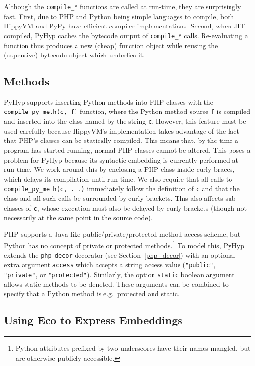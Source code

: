 \documentclass[a4paper,UKenglish]{lipics-v2016}
\newcommand{\ourvm}{PyHyp\xspace}
\newcommand{\hippy}{HippyVM\xspace}
\newcommand{\pypy}{PyPy\xspace}
\begin{document}
Although the \texttt{compile\_*} functions are called at run-time, they are
surprisingly fast. First, due to PHP and Python being simple languages to
compile, both \hippy and \pypy have efficient compiler implementations.
Second, when JIT compiled, \ourvm caches the bytecode output of \texttt{compile\_*}
calls. Re-evaluating a function thus produces a new (cheap) function object
while reusing the (expensive) bytecode object which underlies it.


\subsection{Methods}
\label{sec:methodemb}

\ourvm supports inserting Python methods into PHP classes with the
\texttt{compile\_py\_meth(c, f)} function, where the Python method source \texttt{f} is
compiled and inserted into the class named by the string \texttt{c}. However,
this feature must be used carefully because \hippy's implementation takes advantage of
the fact that PHP's classes can be statically compiled. This means that,
by the time a program has started running, normal PHP classes cannot
be altered. This poses a problem for \ourvm because its syntactic
embedding is currently performed at run-time. We work around this by enclosing a
PHP class inside curly braces, which delays its
compilation until run-time. We also require that all
calls to \texttt{compile\_py\_meth(c, ...)} immediately follow the
definition of \texttt{c} and that the class and all such calls be surrounded by
curly brackets. This also affects sub-classes of \texttt{c}, whose execution
must also be delayed by curly brackets (though not necessarily at the same
point in the source code).

PHP supports a Java-like public/private/protected method access scheme, but
Python has no concept of private or protected
methods.\footnote{Python attributes prefixed by two underscores have their
names mangled, but are otherwise publicly accessible.} To model this,
\ourvm extends the \texttt{php\_decor} decorator (see
Section~\ref{php_decor}) with an optional extra
argument \texttt{access} which accepts a string access value (\texttt{"public"},
\texttt{"private"}, or \texttt{"protected"}). Similarly, the
option \texttt{static} boolean argument allows static methods to be denoted.
These arguments can be combined to specify
that a Python method is e.g.~protected and static.


\subsection{Using Eco to Express Embeddings}
\label{sec:eco}
\end{document}
